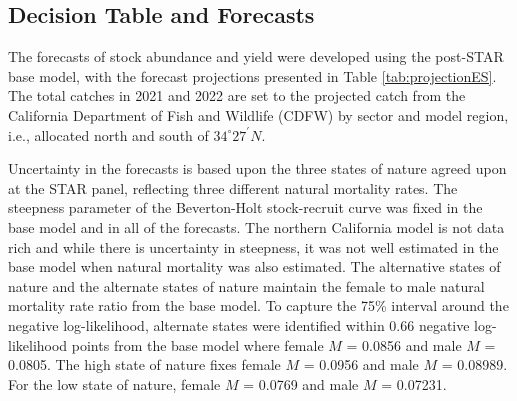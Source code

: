 \documentclass[11pt,
  english,
  a4paper,
]{article}
\begin{document}
\FloatBarrier


\hypertarget{decision-table-and-forecasts}{%
\subsection*{Decision Table and Forecasts}\label{decision-table-and-forecasts}}

\leavevmode\tagmcend\tagstructend

The forecasts of stock abundance and yield were developed using the post-STAR base model, with the forecast projections presented in Table \ref{tab:projectionES}. The total catches in 2021 and 2022 are set to the projected catch from the California Department of Fish and Wildlife (CDFW) by sector and model region, i.e., allocated north and south of $34^\circ 27^\prime N$.

Uncertainty in the forecasts is based upon the three states of nature agreed upon at the STAR panel, reflecting three different natural mortality rates. The steepness parameter of the Beverton-Holt stock-recruit curve was fixed in the base model and in all of the forecasts. The northern California model is not data rich and while there is uncertainty in steepness, it was not well estimated in the base model when natural mortality was also estimated. The alternative states of nature and the alternate states of nature maintain the female to male natural mortality rate ratio from the base model. To capture the 75\% interval around the negative log-likelihood, alternate states were identified within 0.66 negative log-likelihood points from the base model where female {\(M\)\leavevmode\tagmcend\tagstructend} = 0.0856 and male {\(M\)\leavevmode\tagmcend\tagstructend} = 0.0805. The high state of nature fixes female {\(M\)\leavevmode\tagmcend\tagstructend} = 0.0956 and male {\(M\)\leavevmode\tagmcend\tagstructend} = 0.08989. For the low state of nature, female {\(M\)\leavevmode\tagmcend\tagstructend} = 0.0769 and male {\(M\)\leavevmode\tagmcend\tagstructend} = 0.07231.
\end{document}
